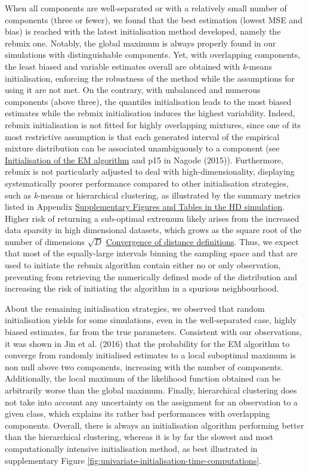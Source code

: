 When all components are well-separated or with a relatively small number of components (three or fewer), we found that the best
estimation (lowest MSE and bias) is reached with the latest initialisation method developed, namely the rebmix one. Notably, the global maximum is always properly found in our simulations with distinguishable components. Yet, with overlapping components, the least biased and variable estimates overall are obtained with \emph{k}-means initialisation, enforcing the robustness of the method while the assumptions for using it are not met. On the contrary, with unbalanced and numerous components (above three), the quantiles initialisation leads to the most biased estimates while the rebmix initialisation induces the highest variability. Indeed, rebmix initialisation is not fitted for highly overlapping mixtures, since one of its most restrictive assumption is that each generated interval of the empirical mixture distribution can be associated unambiguously to a component (see \protect\hyperlink{initialisation-of-the-em-algorithm}{Initialisation of the EM algorithm} and p15 in Nagode (2015)). \color{blue} Furthermore, rebmix is not particularly adjusted to deal with high-dimensionality, displaying systematically poorer performance compared to other initialisation strategies, such as \emph{k}-means or hierarchical clustering, as illustrated by the summary metrics listed in Appendix \protect\hyperlink{supplementary-figures-and-tables-in-the-hd-simulation}{Supplementary Figures and Tables in the HD simulation}. Higher risk of returning a sub-optimal extremum likely arises from the increased data sparsity in high dimensional datasets, which grows as the square root of the number of dimensions \(\sqrt{D}\) \href{https://en.wikipedia.org/wiki/Curse_of_dimensionality\#Distance_function}{Convergence of distance definitions}. Thus, we expect that most of the equally-large intervals binning the sampling space and that are used to initiate the rebmix algorithm contain either no or only observation, preventing from retrieving the numerically defined mode of the distribution and increasing the risk of initiating the algorithm in a spurious neighbourhood. \color{black}

About the remaining initialisation strategies, we observed that random initialisation yields for some simulations, even in the well-separated case, highly biased estimates, far from the true
parameters. Consistent with our observations, it was shown in
Jin et al. (2016) that the probability for the EM algorithm to converge from
randomly initialised estimates to a local suboptimal maximum is non null above two
components, increasing with the number of components. Additionally, the
local maximum of the likelihood function obtained can be arbitrarily
worse than the global maximum. Finally, hierarchical clustering does not
take into account any uncertainty on the assignment for an observation
to a given class, which explains its rather bad performances with
overlapping components. Overall, there is always an initialisation
algorithm performing better than the hierarchical clustering, whereas it
is by far the slowest and most computationally intensive initialisation
method, as best illustrated in supplementary Figure \ref{fig:univariate-initialisation-time-computations}.

